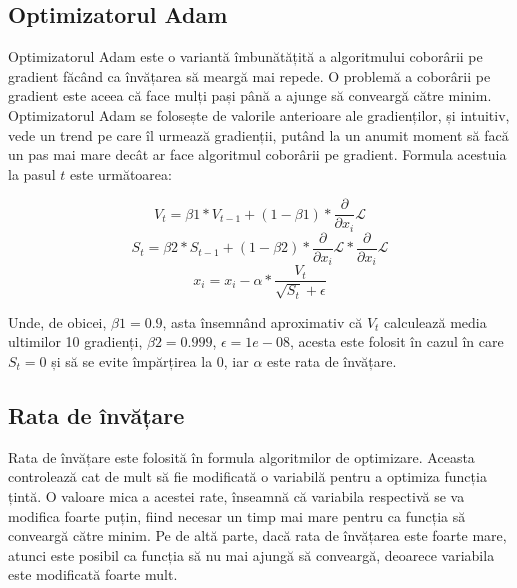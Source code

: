 \subsection{Optimizatorul Adam}
\label{sb:adam_optimizer}
Optimizatorul Adam \cite{coursera_deep_learning} este o variantă îmbunătățită a algoritmului coborârii pe gradient făcând ca învățarea să meargă mai repede. O problemă a coborârii pe gradient este aceea că face mulți pași până a ajunge să conveargă către minim. Optimizatorul Adam se folosește de valorile anterioare ale gradienților, și intuitiv, vede un trend pe care îl urmează gradienții, putând la un anumit moment să facă un pas mai mare decât ar face algoritmul coborârii pe gradient. Formula acestuia la pasul $t$ este următoarea:

\begin{equation}
V_t = \beta1 * V_{t-1} + (1 - \beta1) * \frac{\partial}{\partial{x_i}}\mathcal{L}
\end{equation}
\begin{equation}
S_t = \beta2 * S_{t-1} + (1 - \beta2) * \frac{\partial}{\partial{x_i}}\mathcal{L} * \frac{\partial}{\partial{x_i}}\mathcal{L}
\end{equation}
\begin{equation}
\label{eq:adam}
x_i = x_i - \alpha * \frac{V_t}{\sqrt{S_t} + \epsilon}
\end{equation}

Unde, de obicei, $\beta1 = 0.9$, asta însemnând aproximativ că $V_t$ calculează media ultimilor 10 gradienți, $\beta2 = 0.999$, $\epsilon = 1e-08$, acesta este folosit în cazul în care $S_t = 0$ și să se evite împărțirea la 0, iar $\alpha$ este rata de învățare.

\subsection{Rata de învățare}
\label{sb:learning_rate}
Rata de învățare \cite{coursera_deep_learning} este folosită în formula algoritmilor de optimizare. Aceasta controlează cat de mult să fie modificată o variabilă pentru a optimiza funcția țintă. O valoare mica a acestei rate, înseamnă că variabila respectivă se va modifica foarte puțin, fiind necesar un timp mai mare pentru ca funcția să conveargă către minim. Pe de altă parte, dacă rata de învățarea este foarte mare, atunci este posibil ca funcția să nu mai ajungă să conveargă, deoarece variabila este modificată foarte mult.

\newpage
